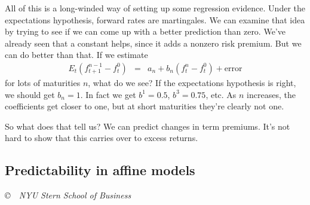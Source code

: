 \documentclass[11pt]{article}
\begin{document}
All of this is a long-winded way of setting up some  regression evidence.
Under the expectations hypothesis, 
forward rates are martingales.
We can examine that idea by trying to see if we can come 
up with a better prediction than zero.
We've already seen that a constant helps, since it adds a nonzero risk premium.
But we can do better than that.
If we estimate 
\begin{eqnarray*}
   E_t ( f^{n-1}_{t+1} - f^{0}_{t} ) &=& a_n + b_n (f^n_t - f^0_t) + \mbox{error} 
\end{eqnarray*}
for lots of maturities $n$, what do we see?
If the expectations hypothesis is right, we should get $b_n = 1$.
In fact we get $b^1 = 0.5$, $b^3 = 0.75$, etc.  
As $n$ increases, the coefficients get closer to one, but at short 
maturities
they're clearly not one. 

So what does that tell us?  We can predict changes in term premiums.  
It's not hard to show that this carries over to excess returns.  


\subsection*{Predictability in affine models}




\vfill \centerline{\it \copyright \ \number\year \
NYU Stern School of Business}
\end{document}
